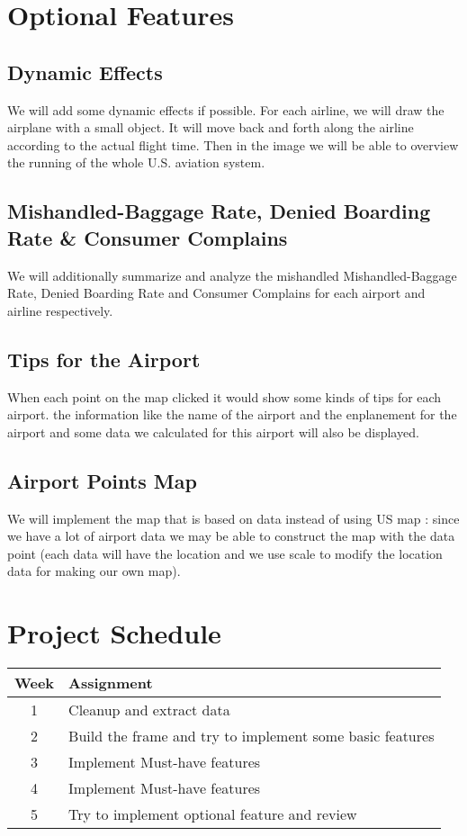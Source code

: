 \documentclass[12pt]{article}
\begin{document}
\section{Optional Features}
    \subsection{Dynamic Effects}
    We will add some dynamic effects if possible. For each airline, we will draw the airplane with a small object. It will move back and forth along the airline according to the actual flight time. Then in the image we will be able to overview the running of the whole U.S. aviation system.
    \subsection{Mishandled-Baggage Rate, Denied Boarding Rate \& Consumer Complains}
    We will additionally summarize and analyze the mishandled Mishandled-Baggage Rate, Denied Boarding Rate and Consumer Complains for each airport and airline respectively.
    \subsection{Tips for the Airport}
    When each point on the map clicked it would show some kinds of tips for each airport. the information like the name of the airport and the enplanement for the airport and some data we calculated for this airport will also be displayed.
    \subsection{Airport Points Map}
    We will implement the map that is based on data instead of using US map : since we have a lot of airport data we may be able to construct the map with the data point (each data will have the location and we use scale to modify the location data for making our own map).
\section{Project Schedule}
\begin{table}[H]
\center
  \begin{tabular}{c|l}
  \hline
  Week & Assignment\\
  \hline
  1 & Cleanup and extract data\\
  2 & Build the frame and try to implement some basic features \\
  3 & Implement Must-have features \\
  4 & Implement Must-have features \\
  5 & Try to implement optional feature and review\\
  \hline
\end{tabular}
\end{table}





\newpage
\renewcommand\refname{Reference}


\end{document}
